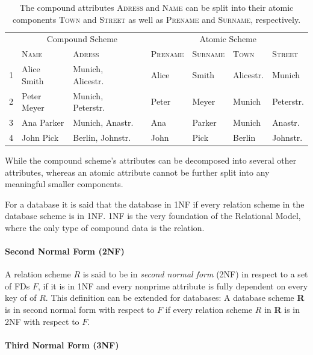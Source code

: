\begin{table}[ht]
    \centering
    \begin{tabular}{@{}rlllllll@{}}\toprule
    & \multicolumn{3}{c}{Compound Scheme} & \phantom{abc}& \multicolumn{2}{c}{Atomic Scheme} \\
    \cmidrule{2-3} \cmidrule{5-8}
    & \textsc{Name} & \textsc{Adress} && \textsc{Prename} & \textsc{Surname} & \textsc{Town} & \textsc{Street}   \\ \midrule
    1 & Alice Smith & Munich, Alicestr. && Alice & Smith & Alicestr. & Munich \\
2 &  Peter Meyer & Munich, Peterstr. && Peter & Meyer & Munich & Peterstr. \\
3 & Ana Parker & Munich, Anastr. && Ana & Parker & Munich & Anastr. \\
4 & John Pick & Berlin, Johnstr. && John & Pick & Berlin & Johnstr. \\
\bottomrule
\end{tabular}
\caption{The compound attributes \textsc{Adress} and \textsc{Name} can be split into their atomic components \textsc{Town} and \textsc{Street} as well as \textsc{Prename} and \textsc{Surname}, respectively.}\label{tab:first-normal-form}
\end{table}
While the compound scheme's attributes can be decomposed into several other attributes, whereas an atomic attribute cannot be further split into any meaningful smaller components.

For a database it is said that the database in 1NF if every relation scheme in the database scheme is in 1NF.
1NF is the very foundation of the Relational Model, where the only type of compound data is the relation.\cite[p.~6]{COD90}

\paragraph{Second Normal Form (2NF)}
A relation scheme \(R\) is said to be in \emph{second normal form} (2NF) in respect to a set of FDs \(F\), if it is in 1NF and every nonprime attribute is fully dependent on every key of of \(R\).\cite[p.~99]{MAI83} This definition can be extended for databases: A database scheme \textbf{R} is in second normal form with respect to \(F\) if every relation scheme \(R\) in \textbf{R} is in 2NF with respect to \(F\).

\paragraph{Third Normal Form (3NF)}


